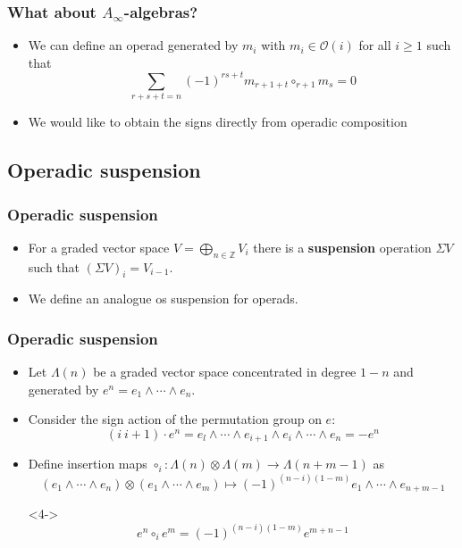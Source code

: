 \documentclass{beamer}
\theoremstyle{definition}
\newcommand{\Z}{\mathbb{Z}}
\begin{document}
\begin{frame}
\frametitle{What about $A_\infty$-algebras?}
\begin{itemize}
\item<1-> We can define an operad generated by $m_i$ with $m_i\in\mathcal{O}(i)$ for all $i\geq 1$ such that 
$$\sum_{r+s+t=n}(-1)^{rs+t}m_{r+1+t}\circ_{r+1}m_s=0$$ 

\item<2-> We would like to obtain the signs directly from operadic composition
\end{itemize}
\end{frame}
\subsection{Operadic suspension}
\begin{frame}
\frametitle{Operadic suspension}
\begin{itemize}
\item<1-> For a graded vector space $V=\bigoplus_{n\in\Z} V_i$ there is a \textbf{suspension} operation $\Sigma V$ such that $(\Sigma V)_i=V_{i-1}$. %
\item<2-> We define an analogue os suspension for operads.
\end{itemize}
\end{frame}
\begin{frame}
\frametitle{Operadic suspension}
\begin{itemize}
\item<1-> Let $\Lambda(n)$ be a graded vector space concentrated in degree $1-n$ and generated by $e^n=e_1\land\cdots\land e_n$.
\item<2-> Consider the sign action of the permutation group on $e$:
\[(i\ i+1)\cdot e^n=e_l\land\cdots\land e_{i+1}\land e_i\land\cdots\land e_n=-e^n\]
\item<3-> Define insertion maps $\circ_i:\Lambda(n)\otimes\Lambda(m)\to\Lambda(n+m-1)$ as
\[(e_1\land\cdots\land e_n)\otimes(e_1\land\cdots\land e_m)\mapsto  (-1)^{(n-i)(1-m)}e_1\land\cdots\land e_{n+m-1}\]
\item[]<4-> \[e^n\circ_i e^m= (-1)^{(n-i)(1-m)}e^{m+n-1}\]
\end{itemize}
\end{frame}
\end{document}
